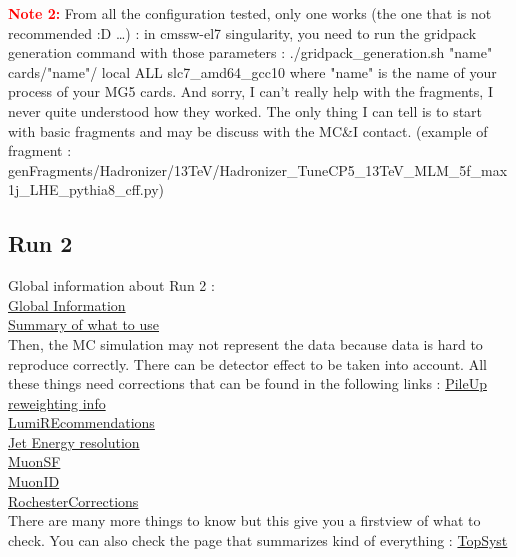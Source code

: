 \documentclass[reprint, a4paper, nofootinbib, amsmath, amssymb, aps]{revtex4-1}
\begin{document}
    \textcolor{red}{\textbf{Note 2:}} From all the configuration tested, only one works (the one that is not recommended :D \dots) : in cmssw-el7 singularity, you need to run the gridpack generation command with those parameters : ./gridpack\_generation.sh "name" cards/"name"/ local ALL slc7\_amd64\_gcc10 where "name" is the name of your process of your MG5 cards. And sorry, I can't really help with the fragments, I never quite understood how they worked. The only thing I can tell is to start with basic fragments and may be discuss with the MC&I contact. (example of fragment : genFragments/Hadronizer/13TeV/Hadronizer\_TuneCP5\_13TeV\_MLM\_5f\_max1j\_LHE\_pythia8\_cff.py)
    
\subsection{Run 2}
    Global information about Run 2 : \\
    \href{https://twiki.cern.ch/twiki/bin/view/CMS/PdmVRun2LegacyAnalysis}{Global Information} \\
    \href{https://twiki.cern.ch/twiki/bin/viewauth/CMS/PdmVAnalysisSummaryTable}{Summary of what to use} \\
    Then, the MC simulation may not represent the data because data is hard to reproduce correctly. There can be detector effect to be taken into account. All these things need corrections that can be found in the following links : 
    \href{https://twiki.cern.ch/twiki/bin/view/CMS/PileupJetIDUL#Recommendations_for_2018_UL_data}{PileUp reweighting info} \\
    \href{https://twiki.cern.ch/twiki/bin/view/CMS/LumiRecommendationsRun2}{LumiREcommendations} \\
    \href{https://twiki.cern.ch/twiki/bin/view/CMSPublic/WorkBookJetEnergyResolution}{Jet Energy resolution} \\
    \href{https://indico.cern.ch/event/1247210/sessions/478562/attachments/2587866/4465075/MuonPOG_tutorial_part2.pdf}{MuonSF} \\
    \href{https://twiki.cern.ch/twiki/bin/viewauth/CMS/SWGuideMuonIdRun2}{MuonID} \\
    \href{https://twiki.cern.ch/twiki/bin/view/CMS/RochcorMuon}{RochesterCorrections}\\
    There are many more things to know but this give you a firstview of what to check. You can also check the page that summarizes kind of everything : \href{https://twiki.cern.ch/twiki/bin/view/CMS/TopSystematics}{TopSyst} 
    
\end{document}
